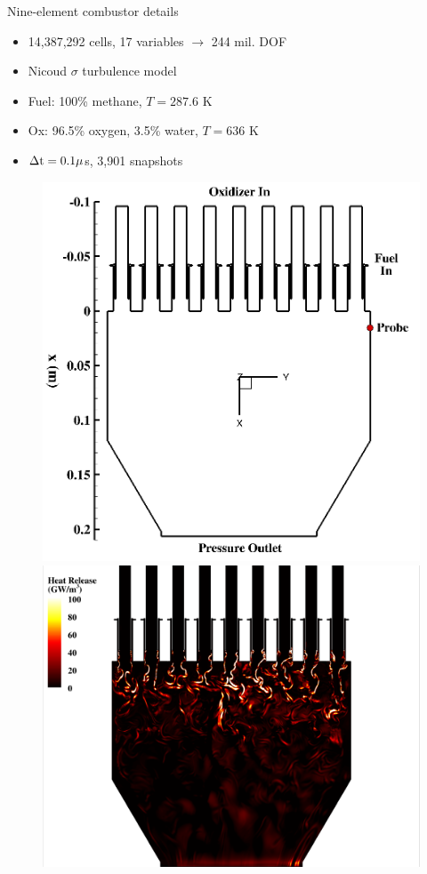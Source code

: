 \documentclass[]{beamer}
\begin{document}
\begin{frame}[noframenumbering]{Nine-element combustor details}
	\begin{itemize}
		\item 14,387,292 cells, 17 variables $\rightarrow$ 244 mil. DOF
		\item Nicoud $\sigma$ turbulence model
		\item Fuel: 100\% methane, $T = 287.6$ K
		\item Ox: 96.5\% oxygen, 3.5\% water, $T = 636$ K
		\item $\Delta \text{t} = 0.1 \mu$s, 3,901 snapshots
	\end{itemize}
	\begin{figure}
		\begin{minipage}{0.49\linewidth}
			\centering
			\includegraphics[width=0.8\linewidth]{Images/experiments/9elem/backup/geom_xy.png}
		\end{minipage}
		\begin{minipage}{0.49\linewidth}
			\centering
			\includegraphics[width=0.8\linewidth,trim={0.5em 0em 6cm 0em},clip]{Images/experiments/9elem/backup/example_heat_z.png}
		\end{minipage}
	\end{figure}
\end{frame}
\end{document}
